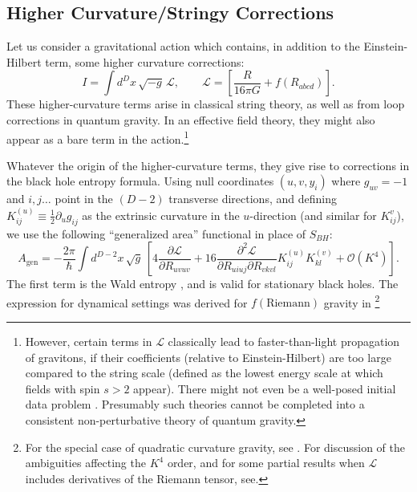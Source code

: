 \documentclass[12pt]{article}
\def\be{\begin{equation}}
\def\ee{\end{equation}}
\begin{document}
\subsection{Higher Curvature/Stringy Corrections} \label{sec:stringcorrect}
Let us consider a gravitational action which contains, in addition to the Einstein-Hilbert term, some higher curvature corrections:
\be
I = \int d^D x \, \sqrt{-g} \, \mathcal{L}, \qquad \mathcal{L} = \left[ \frac{R}{16 \pi G} + f(R_{abcd}) \right].
\ee
These higher-curvature terms arise in classical string theory, 
as well as from loop corrections in quantum gravity.
 In an effective field theory, they might also appear as a bare term in the action.\footnote{However, certain terms in $\mathcal{L}$ classically lead to faster-than-light propagation of gravitons, if their coefficients (relative to Einstein-Hilbert) are too large compared to the string scale (defined as the lowest energy scale at which fields with spin $s>2$ appear)\cite{camanho2016causality,Papallo:2015rna}.  There might not even be a well-posed initial data problem \cite{Papallo:2017qvl,Reall:2014pwa,Reall:2014sla}.  Presumably such theories cannot be completed into a consistent non-perturbative theory of quantum gravity.}


Whatever the origin of the higher-curvature terms, they give rise to corrections in the black hole entropy formula. Using null coordinates $(u,v,y_i)$ where $g_{uv} = -1$ and $i,j \ldots$ point in the $(D-2)$ transverse directions, and defining $K_{ij}^{(u)} \equiv \tfrac{1}{2} \partial_u g_{ij}$ as the extrinsic curvature in the $u$-direction (and similar for $K_{ij}^{v}$), we use the following ``generalized area'' functional in place of $S_{BH}$:
\be \label{eq:SBH}
A_\mathrm{gen} = - \frac{2 \pi}{\hbar} \int d^{D-2} x \,\sqrt{g}\,\left[4 \frac{\partial \mathcal{L}}{\partial R_{uvuv}} + 16 \frac{\partial^2 \mathcal{L}}{\partial R_{uiuj} \partial R_{vkvl}} K_{ij}^{(u)} K_{kl}^{(v)} + \mathcal{O}(K^4)\right].
\ee
The first term is the Wald entropy \cite{wald1993black,JKM,Visser:1993nu,iyer1994some}, and is valid for stationary black holes. The expression for dynamical settings was derived for $f(\mathrm{Riemann})$ gravity in \cite{dong,Wall:2015raa}\footnote{For the special case of quadratic curvature gravity, see \cite{solodukhin2008entanglement,fursaev2013distributional,camps2014generalized}.  For discussion of the ambiguities affecting the $K^4$ order, and for some partial results when $\mathcal{L}$ includes derivatives of the Riemann tensor, see\cite{miao2015holographic,miao2015universal}.}
\end{document}
